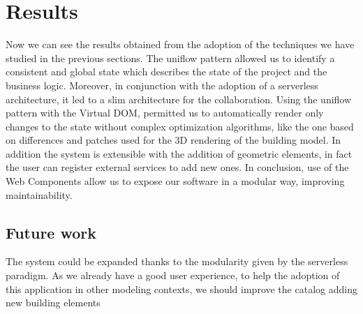 \section{Results}\label{sec:results}

Now we can see the results obtained from the adoption of the techniques we have studied in the previous sections. The uniflow pattern allowed us to identify a consistent and global state which describes the state of the project and the business logic. Moreover, in conjunction with the adoption of a serverless architecture, it led to a slim architecture for the collaboration. Using the uniflow pattern with the Virtual DOM, permitted us to automatically render only changes to the state without complex optimization algorithms, like the one based on differences and patches used for the 3D rendering of the building model. In addition the system is extensible with the addition of geometric elements, in fact the user can register external services to add new ones. In conclusion, use of the Web Components allow us to expose our software in a modular way, improving maintainability.

\subsection{Future work}

The system could be expanded thanks to the modularity given by the serverless paradigm. As we already have a good user experience, to help the adoption of this application in other modeling contexts, we should improve the catalog adding new building elements